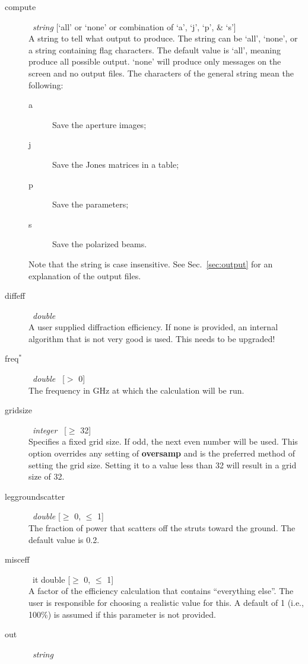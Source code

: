 \documentclass{article}
\begin{document}
\begin{description}
\item[compute] \ {\it string} [`all' or `none' or combination of 
`a', `j', `p', \& `s'] \\
A string to tell what output to produce.  The string can be `all', `none', 
or a string containing flag characters.  The default value is `all', meaning
produce all possible output.  `none' will produce only messages on the screen
and no output files.  The characters of the general string mean the following:
  \begin{description}
    \item[a] Save the aperture images;
    \item[j] Save the Jones matrices in a table;
    \item[p] Save the parameters;
    \item[s] Save the polarized beams.
  \end{description}
Note that the string is case insensitive.  See Sec.~\ref{sec:output} for
an explanation of the output files.
\item[diffeff] \ {\it double} \\
A user supplied diffraction efficiency.  If none is provided, an internal
algorithm that is not very good is used.  This needs to be upgraded!
\item[freq$^*$] \ {\it double} \ [$>$ 0] \\
The frequency in GHz at which the calculation will be run.
\item[gridsize] \ {\it integer} \ [$\ge$ 32] \\
Specifies a fixed grid size.  If odd, the next even number will be used.
This option overrides any setting of {\bf oversamp} and is the preferred 
method of setting the grid size.  Setting it to a value less than 32 will
result in a grid size of 32.
\item[leggroundscatter] \ {\it double} [$\ge$ 0, $\le$ 1]\\
The fraction of power that scatters off the struts toward the ground.  The
default value is 0.2.
\item[misceff] \ {it double} [$\ge$ 0, $\le$ 1]\\
A factor of the efficiency calculation that contains ``everything else''.  
The user is responsible for choosing a realistic value for this.  A default
of 1 (i.e., 100\%) is assumed if this parameter is not provided.
\item[out] \ {\it string} \\

\end{description}
\end{document}
